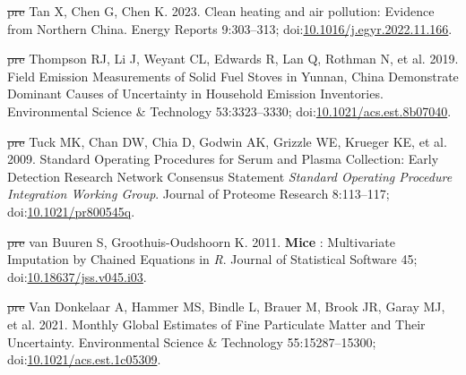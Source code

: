 \documentclass[
  letterpaper,
  DIV=11,
  numbers=noendperiod]{scrartcl}
\newlength{\cslhangindent}
\newenvironment{CSLReferences}[2] %
 {\begin{list}{}{%
  \setlength{\itemindent}{0pt} %
  \setlength{\leftmargin}{0pt} %
  \setlength{\parsep}{0pt} %
  \ifodd #1
   \setlength{\leftmargin}{\cslhangindent} %
   \setlength{\itemindent}{-1\cslhangindent} %
  \fi
  \setlength{\itemsep}{#2\baselineskip}}} %
 {\end{list}} %
\providecommand{\DIFdel}[1]{{\protect\color{red}\sout{#1}}}                      %
\providecommand{\DIFaddbegin}{} %
\providecommand{\DIFaddend}{} %
\providecommand{\DIFdelbegin}{} %
\providecommand{\DIFdelend}{} %
\newcommand{\DIFscaledelfig}{0.5}
\newlength{\DIFdelgraphicswidth} %
\newlength{\DIFdelgraphicsheight} %
\newcommand{\DIFaddincludegraphics}[2][]{{\color{blue}\fbox{\DIFOincludegraphics[#1]{#2}}}} %
\newcommand{\DIFdelincludegraphics}[2][]{%
\sbox{\DIFdelgraphicsbox}{\DIFOincludegraphics[#1]{#2}}%
\settoboxwidth{\DIFdelgraphicswidth}{\DIFdelgraphicsbox} %
\settoboxtotalheight{\DIFdelgraphicsheight}{\DIFdelgraphicsbox} %
\scalebox{\DIFscaledelfig}{%
\parbox[b]{\DIFdelgraphicswidth}{\usebox{\DIFdelgraphicsbox}\\[-\baselineskip] \rule{\DIFdelgraphicswidth}{0em}}\llap{\resizebox{\DIFdelgraphicswidth}{\DIFdelgraphicsheight}{%
\setlength{\unitlength}{\DIFdelgraphicswidth}%
\begin{picture}(1,1)%
\thicklines\linethickness{2pt} %
{\color[rgb]{1,0,0}\put(0,0){\framebox(1,1){}}}%
{\color[rgb]{1,0,0}\put(0,0){\line( 1,1){1}}}%
{\color[rgb]{1,0,0}\put(0,1){\line(1,-1){1}}}%
\end{picture}%
}\hspace*{3pt}}} %
} %
\DeclareRobustCommand{\DIFaddbegin}{\DIFOaddbegin \let\includegraphics\DIFaddincludegraphics} %
\DeclareRobustCommand{\DIFaddend}{\DIFOaddend \let\includegraphics\DIFOincludegraphics} %
\DeclareRobustCommand{\DIFdelbegin}{\DIFOdelbegin \let\includegraphics\DIFdelincludegraphics} %
\DeclareRobustCommand{\DIFdelend}{\DIFOaddend \let\includegraphics\DIFOincludegraphics} %
\begin{document}
\begin{CSLReferences}{1}{1}
\DIFdelbegin %
\DIFdel{pre}%
\DIFdelend \DIFaddbegin {}
\DIFaddend Tan X, Chen G, Chen K. 2023. Clean heating and air pollution: {Evidence}
from {Northern China}. Energy Reports 9:303--313;
doi:\href{https://doi.org/10.1016/j.egyr.2022.11.166}{10.1016/j.egyr.2022.11.166}.

\DIFdelbegin %
\DIFdel{pre}%
\DIFdelend \DIFaddbegin {}
\DIFaddend Thompson RJ, Li J, Weyant CL, Edwards R, Lan Q, Rothman N, et al. 2019.
Field {Emission Measurements} of {Solid Fuel Stoves} in {Yunnan}, {China
Demonstrate Dominant Causes} of {Uncertainty} in {Household Emission
Inventories}. Environmental Science \& Technology 53:3323--3330;
doi:\href{https://doi.org/10.1021/acs.est.8b07040}{10.1021/acs.est.8b07040}.

\DIFdelbegin %
\DIFdel{pre}%
\DIFdelend \DIFaddbegin {}
\DIFaddend Tuck MK, Chan DW, Chia D, Godwin AK, Grizzle WE, Krueger KE, et al.
2009. Standard {Operating Procedures} for {Serum} and {Plasma
Collection}: {Early Detection Research Network Consensus Statement}
{\emph{Standard Operating Procedure Integration Working Group}}. Journal
of Proteome Research 8:113--117;
doi:\href{https://doi.org/10.1021/pr800545q}{10.1021/pr800545q}.

\DIFdelbegin %
\DIFdel{pre}%
\DIFdelend \DIFaddbegin {}
\DIFaddend van Buuren S, Groothuis-Oudshoorn K. 2011. {\textbf{Mice}} :
{Multivariate Imputation} by {Chained Equations} in {\emph{R}}. Journal
of Statistical Software 45;
doi:\href{https://doi.org/10.18637/jss.v045.i03}{10.18637/jss.v045.i03}.

\DIFdelbegin %
\DIFdel{pre}%
\DIFdelend \DIFaddbegin {}
\DIFaddend Van Donkelaar A, Hammer MS, Bindle L, Brauer M, Brook JR, Garay MJ, et
al. 2021. Monthly {Global Estimates} of {Fine Particulate Matter} and
{Their Uncertainty}. Environmental Science \& Technology
55:15287--15300;
doi:\href{https://doi.org/10.1021/acs.est.1c05309}{10.1021/acs.est.1c05309}.


\end{CSLReferences}
\end{document}

